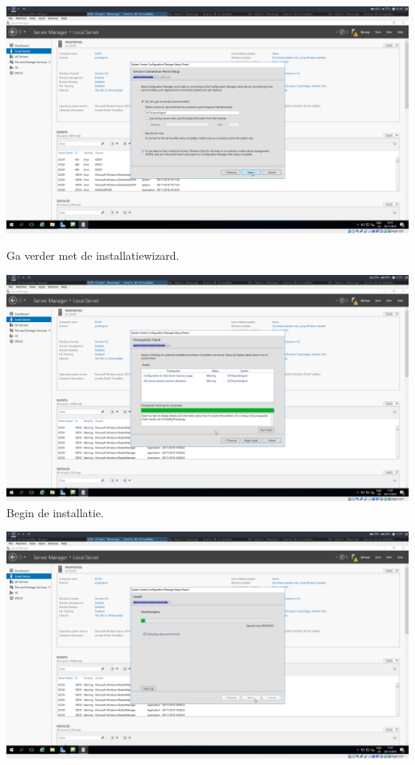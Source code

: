 \documentclass[a4paper]{article}
\begin{document}
\begin{center}
\includegraphics[width=15cm]{Pictures/SCCM/6/1543504690.png}

Ga verder met de installatiewizard.
\end{center}
\begin{center}
\includegraphics[width=15cm]{Pictures/SCCM/6/1543507674.png}
Begin de installatie.
\end{center}
\begin{center}
\includegraphics[width=15cm]{Pictures/SCCM/6/1543507677.png}
\end{center}
\end{document}
